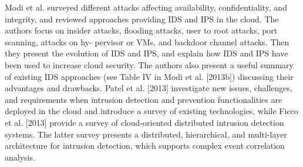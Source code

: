 \documentclass[../main.tex]{subfiles}
\begin{document}
Modi et al. surveyed different attacks affecting availability, confidentiality, and integrity,
and reviewed approaches providing IDS and IPS in the cloud. The authors focus on
insider attacks, flooding attacks, user to root attacks, port scanning, attacks on hy-
pervisor or VMs, and backdoor channel attacks. Then they present the evolution of
IDS and IPS, and explain how IDS and IPS have been used to increase cloud security.
The authors also present a useful summary of existing IDS approaches (see Table IV
in Modi et al. [2013b]) discussing their advantages and drawbacks. Patel et al. [2013]
investigate new issues, challenges, and requirements when intrusion detection and
prevention functionalities are deployed in the cloud and introduce a survey of existing
technologies, while Ficco et al. [2013] provide a survey of cloud-oriented distributed
intrusion detection systems. The latter survey presents a distributed, hierarchical,
and multi-layer architecture for intrusion detection, which supports complex event
correlation analysis.
\end{document}
